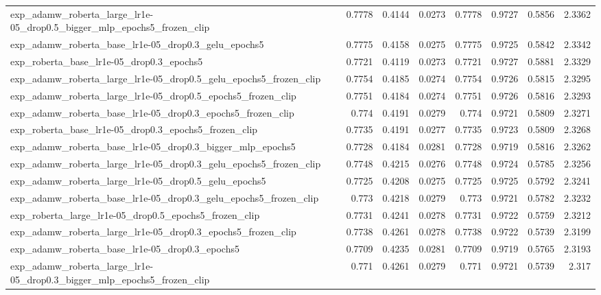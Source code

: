 \documentclass[a4paper,oneside,bibliography=totoc]{scrbook}
\begin{document}
\begin{landscape}
\begin{center}
\begin{longtable}{p{4cm} *{7}{r}}
        exp\_adamw\_roberta\_large\_lr1e-05\_drop0.5\_bigger\_mlp\_epochs5\_frozen\_clip & 0.7778 & 0.4144 & 0.0273 & 0.7778 & 0.9727 & 0.5856 & 2.3362 \\ 
        exp\_adamw\_roberta\_base\_lr1e-05\_drop0.3\_gelu\_epochs5 & 0.7775 & 0.4158 & 0.0275 & 0.7775 & 0.9725 & 0.5842 & 2.3342 \\ 
        exp\_roberta\_base\_lr1e-05\_drop0.3\_epochs5 & 0.7721 & 0.4119 & 0.0273 & 0.7721 & 0.9727 & 0.5881 & 2.3329 \\ 
        exp\_adamw\_roberta\_large\_lr1e-05\_drop0.5\_gelu\_epochs5\_frozen\_clip & 0.7754 & 0.4185 & 0.0274 & 0.7754 & 0.9726 & 0.5815 & 2.3295 \\ 
        exp\_adamw\_roberta\_large\_lr1e-05\_drop0.5\_epochs5\_frozen\_clip & 0.7751 & 0.4184 & 0.0274 & 0.7751 & 0.9726 & 0.5816 & 2.3293 \\ 
        exp\_adamw\_roberta\_base\_lr1e-05\_drop0.3\_epochs5\_frozen\_clip & 0.774 & 0.4191 & 0.0279 & 0.774 & 0.9721 & 0.5809 & 2.3271 \\ 
        exp\_roberta\_base\_lr1e-05\_drop0.3\_epochs5\_frozen\_clip & 0.7735 & 0.4191 & 0.0277 & 0.7735 & 0.9723 & 0.5809 & 2.3268 \\ 
        exp\_adamw\_roberta\_base\_lr1e-05\_drop0.3\_bigger\_mlp\_epochs5 & 0.7728 & 0.4184 & 0.0281 & 0.7728 & 0.9719 & 0.5816 & 2.3262 \\ 
        exp\_adamw\_roberta\_large\_lr1e-05\_drop0.3\_gelu\_epochs5\_frozen\_clip & 0.7748 & 0.4215 & 0.0276 & 0.7748 & 0.9724 & 0.5785 & 2.3256 \\ 
        exp\_adamw\_roberta\_large\_lr1e-05\_drop0.5\_gelu\_epochs5 & 0.7725 & 0.4208 & 0.0275 & 0.7725 & 0.9725 & 0.5792 & 2.3241 \\ 
        exp\_adamw\_roberta\_base\_lr1e-05\_drop0.3\_gelu\_epochs5\_frozen\_clip & 0.773 & 0.4218 & 0.0279 & 0.773 & 0.9721 & 0.5782 & 2.3232 \\ 
        exp\_roberta\_large\_lr1e-05\_drop0.5\_epochs5\_frozen\_clip & 0.7731 & 0.4241 & 0.0278 & 0.7731 & 0.9722 & 0.5759 & 2.3212 \\ 
        exp\_adamw\_roberta\_large\_lr1e-05\_drop0.3\_epochs5\_frozen\_clip & 0.7738 & 0.4261 & 0.0278 & 0.7738 & 0.9722 & 0.5739 & 2.3199 \\ 
        exp\_adamw\_roberta\_base\_lr1e-05\_drop0.3\_epochs5 & 0.7709 & 0.4235 & 0.0281 & 0.7709 & 0.9719 & 0.5765 & 2.3193 \\ 
        exp\_adamw\_roberta\_large\_lr1e-05\_drop0.3\_bigger\_mlp\_epochs5\_frozen\_clip & 0.771 & 0.4261 & 0.0279 & 0.771 & 0.9721 & 0.5739 & 2.317 \\ 

\end{longtable}
\end{center}
\end{landscape}
\end{document}
